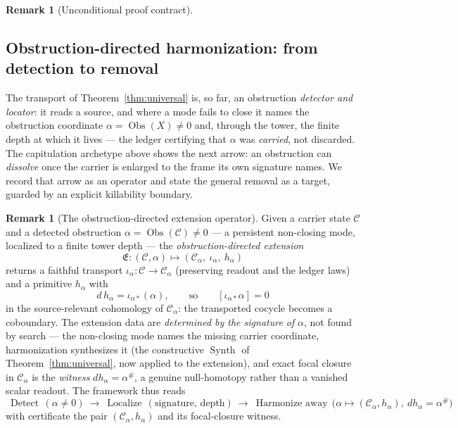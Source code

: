 \documentclass[11pt]{article}
\newcommand{\inst}[1]{%
\samnote{INSTRUCTION: #1}%
}
\theoremstyle{definition}
\newtheorem{remark}[theorem]{Remark}
\begin{document}
\begin{remark}[Unconditional proof contract]
\begin{enumerate}
\inst{move to new hodge part}
\section{Obstruction-directed harmonization: from detection to removal}\label{sec:obs-removal}

The transport of Theorem~\ref{thm:universal} is, so far, an obstruction \emph{detector and locator}: it reads a
source, and where a mode fails to close it names the obstruction coordinate $\alpha=\operatorname{Obs}(X)\neq0$
and, through the tower, the finite depth at which it lives --- the ledger certifying that $\alpha$ was
\emph{carried}, not discarded. The capitulation archetype above shows the next arrow: an obstruction can
\emph{dissolve} once the carrier is enlarged to the frame its own signature names. We record that arrow as an
operator and state the general removal as a target, guarded by an explicit killability boundary.

\begin{remark}[The obstruction-directed extension operator]\label{def:obs-ext}
Given a carrier state $\mathcal C$ and a detected obstruction $\alpha=\operatorname{Obs}(\mathcal C)\neq0$ --- a
persistent non-closing mode, localized to a finite tower depth --- the \emph{obstruction-directed extension}
\[
  \mathfrak E:(\mathcal C,\alpha)\longmapsto(\mathcal C_\alpha,\ \iota_\alpha,\ h_\alpha)
\]
returns a faithful transport $\iota_\alpha:\mathcal C\to\mathcal C_\alpha$ (preserving readout and the ledger
laws) and a primitive $h_\alpha$ with
\[
  d\,h_\alpha=\iota_{\alpha*}(\alpha),\qquad\text{so}\qquad [\iota_{\alpha*}\alpha]=0
\]
in the source-relevant cohomology of $\mathcal C_\alpha$: the transported cocycle becomes a coboundary. The
extension data are \emph{determined by the signature of} $\alpha$, not found by search --- the non-closing mode
names the missing carrier coordinate, harmonization synthesizes it (the constructive $\operatorname{Synth}$ of
Theorem~\ref{thm:universal}, now applied to the extension), and exact focal closure in $\mathcal C_\alpha$ is the
\emph{witness} $d h_\alpha=\alpha^\#$, a genuine null-homotopy rather than a vanished scalar readout. The
framework thus reads
\[
  \boxed{\ \operatorname{Detect}\,(\alpha\neq0)\ \rightarrow\ \operatorname{Localize}\,(\text{signature, depth})\ \rightarrow\ \operatorname{Harmonize\ away}\,\big(\alpha\mapsto(\mathcal C_\alpha,h_\alpha),\ dh_\alpha=\alpha^\#\big)\ }
\]
with certificate the pair $(\mathcal C_\alpha,h_\alpha)$ and its focal-closure witness.
\end{remark}


\end{enumerate}
\end{remark}
\end{document}
